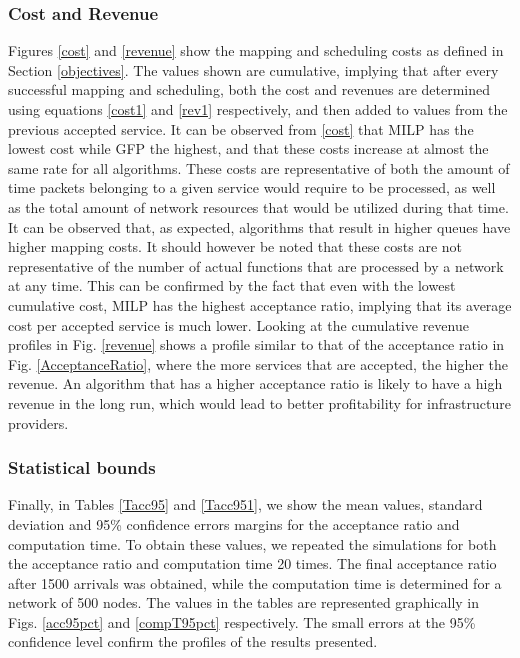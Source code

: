 \documentclass[conference]{IEEEtran}
\begin{document}
\subsubsection{Cost and Revenue}
Figures \ref{cost} and \ref{revenue} show the mapping and scheduling costs as defined in Section \ref{objectives}. The values shown are cumulative, implying that after every successful mapping and scheduling, both the cost and revenues are determined using equations \eqref{cost1} and \eqref{rev1} respectively, and then added to values from the previous accepted service. It can be observed from \ref{cost} that MILP has the lowest cost while GFP the highest, and that these costs increase at almost the same rate for all algorithms. These costs are representative of both the amount of time packets belonging to a given service would require to be processed, as well as the total amount of network resources that would be utilized during that time. It can be observed that, as expected, algorithms that result in higher queues have higher mapping costs. It should however be noted that these costs are not representative of the number of actual functions that are processed by a network at any time. This can be confirmed by the fact that even with the lowest cumulative cost, MILP has the highest acceptance ratio, implying that its average cost per accepted service is much lower. Looking at the cumulative revenue profiles in Fig. \ref{revenue} shows a profile similar to that of the acceptance ratio in Fig. \ref{AcceptanceRatio}, where the more services that are accepted, the higher the revenue. An algorithm that has a higher acceptance ratio is likely to have a high revenue in the long run, which would lead to better profitability for infrastructure providers.

\subsubsection{Statistical bounds}
Finally, in Tables \ref{Tacc95} and \ref{Tacc951}, we show the mean values, standard deviation and 95\% confidence errors margins for the acceptance ratio and computation time. To obtain these values, we repeated the simulations for both the acceptance ratio and computation time 20 times. The final acceptance ratio after 1500 arrivals was obtained, while the computation time is determined for a network of 500 nodes. The values in the tables are represented graphically in Figs. \ref{acc95pct} and \ref{compT95pct} respectively. The small errors at the 95\% confidence level confirm the profiles of the results presented.
\end{document}
